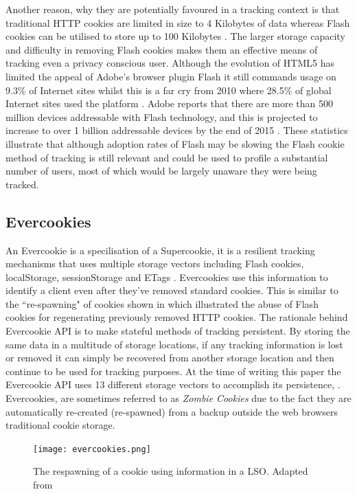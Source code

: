 \documentclass[12pt]{article}
\begin{document}
Another reason, why they are potentially favoured in a tracking context is that traditional HTTP cookies are limited in size to 4 Kilobytes of data whereas Flash cookies can be utilised to store up to 100 Kilobytes \parencite{flashCookies}. The larger storage capacity and difficulty in removing Flash cookies makes them an effective means of tracking even a privacy conscious user. Although the evolution of HTML5 has limited the appeal of Adobe's browser plugin Flash it still commands usage on 9.3\% of Internet sites whilst this is a far cry from 2010 where 28.5\% of global Internet sites used the platform \parencite{flashStats}. Adobe reports that there are more than 500 million devices addressable with Flash technology, and this is projected to increase to over 1 billion addressable devices by the end of 2015 \parencite{adobeFlash}. These statistics illustrate that although adoption rates of Flash may be slowing the Flash cookie method of tracking is still relevant and could be used to profile a substantial number of users, most of which would be largely unaware they were being tracked. 

\subsection{Evercookies} \label{evercookies}
An Evercookie is a specilisation of a Supercookie, it is a resilient tracking mechanisms that uses multiple storage vectors including Flash cookies, localStorage, sessionStorage and ETags \parencite{evercookies}. Evercookies use this information to identify a client even after they've removed standard cookies. This is similar to the ``re-spawning" of cookies shown in \parencite{flashCookiesPrivacy} which illustrated the abuse of Flash cookies for regenerating previously removed HTTP cookies. The rationale behind Evercookie API is to make stateful methods of tracking persistent. By storing the same data in a multitude of storage locations, if any tracking information is lost or removed it can simply be recovered from another storage location and then continue to be used for tracking purposes. At the time of writing this paper the Evercookie API uses 13 different storage vectors to accomplish its persistence,  \parencite{evercookies}. Evercookies, are sometimes referred to as \textit{Zombie Cookies} due to the fact they are automatically re-created (re-spawned) from a backup outside the web browsers traditional cookie storage. \\

\begin{figure}[H]
    \centering
    \texttt{[image: evercookies.png]}
    \caption{The respawning of a cookie using information in a LSO. Adapted from \parencite{webNeverForgets}}
    \label{fig:evercookies}
\end{figure}
\end{document}
